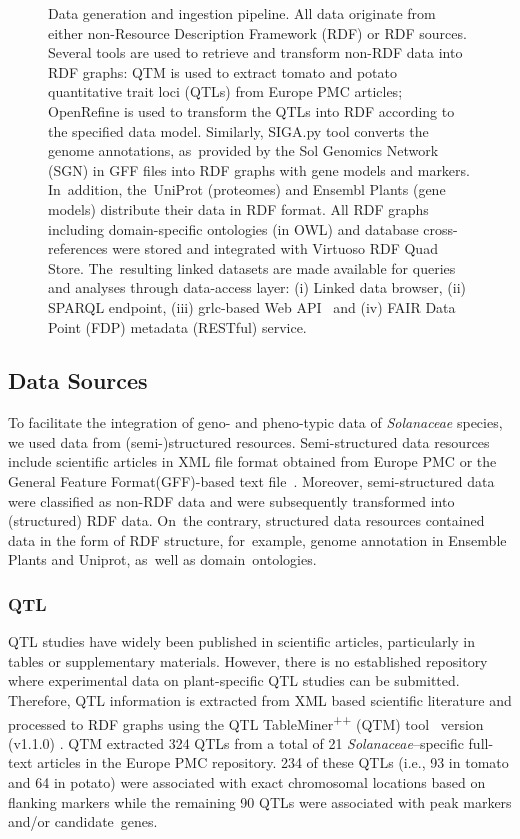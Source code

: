 \documentclass[applsci,article,accept,moreauthors,pdftex]{Definitions/mdpi}
\begin{document}
{\begin{figure}[H]
\caption{Data generation and ingestion pipeline. All data originate from either non-Resource Description Framework (RDF) or RDF sources. Several tools are used to retrieve and transform non-RDF data into RDF graphs: QTM %
is used to extract tomato and potato quantitative trait loci (QTLs) from Europe PMC %
 articles; OpenRefine is used to transform the QTLs into RDF according to the specified data model. Similarly, SIGA.py tool converts the genome annotations, as~provided by the Sol Genomics Network (SGN) in GFF files into RDF graphs with gene models and markers. In~addition, the~UniProt (proteomes) and Ensembl Plants (gene models) distribute their data in RDF format. All RDF graphs including domain-specific ontologies (in OWL) and database cross-references were stored and integrated with Virtuoso RDF Quad Store. The~resulting linked datasets are made available for queries and analyses through data-access layer: (i) Linked data browser, (ii) SPARQL endpoint, (iii) grlc-based Web API~\cite{Merono-Penuela2016} and (iv) FAIR Data Point (FDP) metadata (RESTful) service.}
\label{Figure1}
\end{figure}
\unskip


\subsection{Data Sources } 

To facilitate the integration of geno- and pheno-typic data of \textit{Solanaceae} %
species, we used data from (semi-)structured resources. Semi-structured data resources include scientific articles in XML file format obtained from Europe PMC or the General Feature Format(GFF)-based text file~\cite{europe2015europe,GFF3}. Moreover, semi-structured data were classified as non-RDF data and were subsequently transformed into (structured) RDF data. On~the contrary, structured data resources contained data in the form of RDF structure, for~example, genome annotation in Ensemble Plants and Uniprot, as~well as domain~ontologies.  

\subsubsection{QTL}
QTL studies have widely been published in scientific articles, particularly in tables or supplementary materials. However, there is no established repository where experimental data on plant-specific QTL studies can be submitted. Therefore, QTL information is extracted from XML based scientific literature and processed to RDF graphs using the QTL TableMiner\textsuperscript{++} (QTM) tool~\cite{singh2018qtltableminer++} version (v1.1.0) \cite{singh_gurnoor_2019_1193640}. QTM extracted 324 QTLs from a total of 21 \textit{Solanaceae}–specific full-text articles in the Europe PMC repository. 234 of these QTLs (i.e., 93 in tomato and 64 in potato) were associated with exact chromosomal locations based on flanking markers while the remaining 90 QTLs were associated with peak markers and/or candidate~genes. 

}
\end{document}
